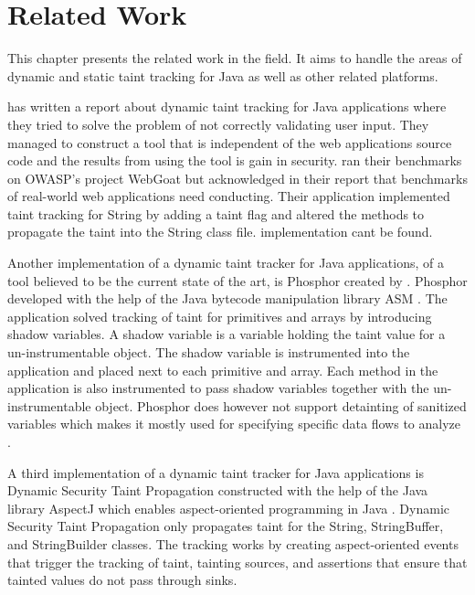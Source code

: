 \chapter{Related Work}
\label{RW}
This chapter presents the related work in the field. It aims to handle the areas of dynamic and static taint tracking for Java as well as other related platforms.

\textcite{Haldar} has written a report about dynamic taint tracking for Java applications where they tried to solve the problem of not correctly validating user input. They managed to construct a tool that is independent of the web applications source code and the results from using the tool is gain in security. \textcite{Haldar} ran their benchmarks on OWASP’s project WebGoat \parencite{webgoat} but acknowledged in their report that benchmarks of real-world web applications need conducting. Their application implemented taint tracking for String by adding a taint flag and altered the methods to propagate the taint into the String class file. \textcite{Haldar} implementation cant be found.

Another implementation of a dynamic taint tracker for Java applications, of a tool believed to be the current state of the art, is Phosphor \parencite{phosphor} created by \textcite{BellJ.2014PIdd}. Phosphor developed with the help of the Java bytecode manipulation library ASM \parencite{asm}. The application solved tracking of taint for primitives and arrays by introducing shadow variables. A shadow variable is a variable holding the taint value for a un-instrumentable object. The shadow variable is instrumented into the application and placed next to each primitive and array. Each method in the application is also instrumented to pass shadow variables together with the un-instrumentable object. Phosphor does however not support detainting of sanitized variables which makes it mostly used for specifying specific data flows to analyze \parencite{BellJ.2014PIdd}. 

A third implementation of a dynamic taint tracker for Java applications is Dynamic Security Taint Propagation \parencite{securityTaint} constructed with the help of the Java library AspectJ which enables aspect-oriented programming in Java \parencite{aspectj}. Dynamic Security Taint Propagation only propagates taint for the String, StringBuffer, and StringBuilder classes. The tracking works by creating aspect-oriented events that trigger the tracking of taint, tainting sources, and assertions that ensure that tainted values do not pass through sinks.

